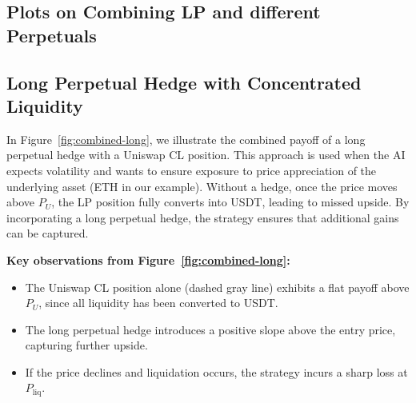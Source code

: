 \documentclass[12pt]{article}
\begin{document}
\subsection{Plots on Combining LP and different Perpetuals}
\label{sec:fiveway2}

\subsection{Long Perpetual Hedge with Concentrated Liquidity}

In Figure~\ref{fig:combined-long}, we illustrate the combined payoff of a long perpetual hedge with a Uniswap CL position. This approach is used when the AI expects volatility and wants to ensure exposure to price appreciation of the underlying asset (ETH in our example). Without a hedge, once the price moves above $P_U$, the LP position fully converts into USDT, leading to missed upside. By incorporating a long perpetual hedge, the strategy ensures that additional gains can be captured.
\newpage
\medskip

\textbf{Key observations from Figure~\ref{fig:combined-long}:}
\begin{itemize}
	\item The Uniswap CL position alone (dashed gray line) exhibits a flat payoff above $P_U$, since all liquidity has been converted to USDT.
	\item The long perpetual hedge introduces a positive slope above the entry price, capturing further upside.
	\item If the price declines and liquidation occurs, the strategy incurs a sharp loss at $P_{\mathrm{liq}}$.
\end{itemize}
\end{document}
